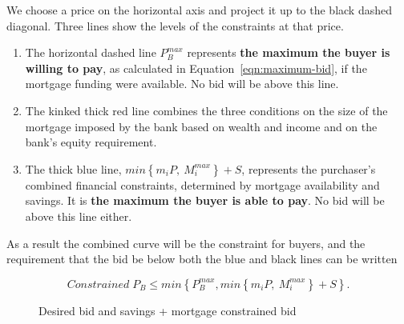 {We choose a price on the horizontal axis and project it up to the black dashed diagonal. Three lines show the levels of the constraints at that price.
\begin{enumerate}
    \item The horizontal dashed line $P_B^{max}$ represents \textbf{the maximum the buyer is willing to pay}, as calculated in Equation~\ref{eqn:maximum-bid}, if the mortgage funding were available. No bid will be above this line. 

    \item The kinked thick red line combines the three conditions on the size of the mortgage imposed by the bank based on wealth and income and on the bank's equity requirement.
   
    \item The thick blue line, $min\left\{m_i P,\  M_{i}^{max}\right\}+ S $, represents the purchaser's combined financial constraints, determined by mortgage availability and savings. It is \textbf{the maximum the buyer is able to pay}.  No bid will be above this line either.
\end{enumerate}
 As a result the combined curve will be the constraint for buyers, and the requirement that the bid be below both the blue and black lines can be written

\begin{equation}
    Constrained\; P_{B} \le min \left\{P^{max}_B, min\left\{m_i P,\  M_{i}^{max}\right\}+ S \right\}.  \label{eqn:bid_diagonal}
\end{equation}




 \begin{figure}
    \centering
    
    \caption{Desired bid  and savings + mortgage constrained bid}
    \label{fig:savings-constraint}
    \end{figure}

%

}
